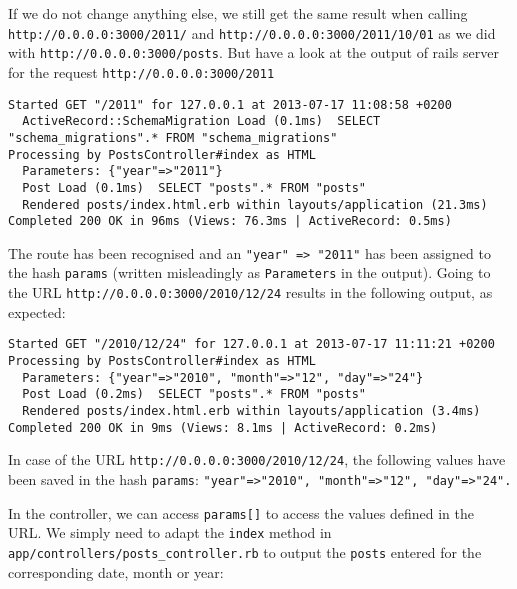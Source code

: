\documentclass[a4paper]{book}
\begin{document}
If we do not change anything else, we still get the same result when calling \texttt{http://0.0.0.0:3000/2011/} and \texttt{http://0.0.0.0:3000/2011/10/01} as we did with \texttt{http://0.0.0.0:3000/posts}. But have a look at the output of rails server for the request \texttt{http://0.0.0.0:3000/2011}

\begin{shaded}\begin{verbatim}
Started GET "/2011" for 127.0.0.1 at 2013-07-17 11:08:58 +0200
  ActiveRecord::SchemaMigration Load (0.1ms)  SELECT "schema_migrations".* FROM "schema_migrations"
Processing by PostsController#index as HTML
  Parameters: {"year"=>"2011"}
  Post Load (0.1ms)  SELECT "posts".* FROM "posts"
  Rendered posts/index.html.erb within layouts/application (21.3ms)
Completed 200 OK in 96ms (Views: 76.3ms | ActiveRecord: 0.5ms)
\end{verbatim}\end{shaded}

The route has been recognised and an \texttt{"year" =\textgreater{}       "2011"} has been assigned to the hash \texttt{params} (written misleadingly as \texttt{Parameters} in the output). Going to the URL \texttt{http://0.0.0.0:3000/2010/12/24} results in the following output, as expected:

\begin{shaded}\begin{verbatim}
Started GET "/2010/12/24" for 127.0.0.1 at 2013-07-17 11:11:21 +0200
Processing by PostsController#index as HTML
  Parameters: {"year"=>"2010", "month"=>"12", "day"=>"24"}
  Post Load (0.2ms)  SELECT "posts".* FROM "posts"
  Rendered posts/index.html.erb within layouts/application (3.4ms)
Completed 200 OK in 9ms (Views: 8.1ms | ActiveRecord: 0.2ms)
\end{verbatim}\end{shaded}

In case of the URL \texttt{http://0.0.0.0:3000/2010/12/24}, the following values have been saved in the hash \texttt{params}: \texttt{"year"=\textgreater{}"2010", "month"=\textgreater{}"12",       "day"=\textgreater{}"24".}

In the controller, we can access \texttt{params{[}{]}} to access the values defined in the URL. We simply need to adapt the \texttt{index} method in \texttt{app/controllers/posts\_controller.rb} to output the \texttt{posts} entered for the corresponding date, month or year:
\end{document}
